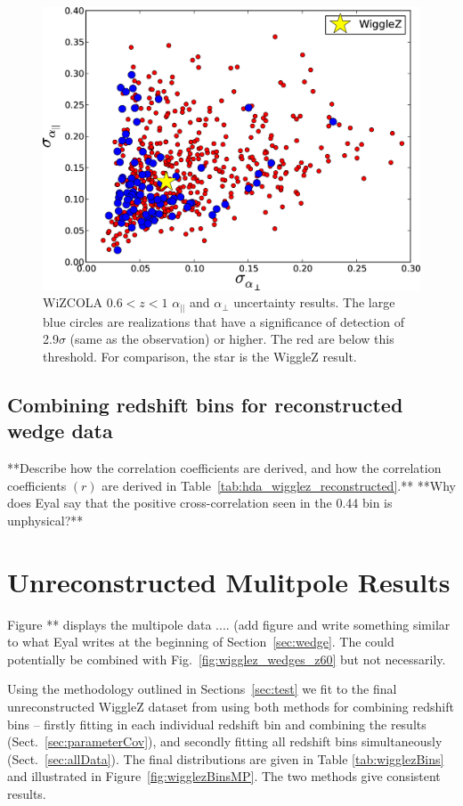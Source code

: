 \documentclass[iop,twocolappendix]{emulateapj}
\newcommand{\blue}{\color{blue}}
\begin{document}
{\begin{figure}
\begin{center}
\includegraphics[width=0.7\columnwidth]{figures/WiZCOLA_unc_z0pt6_1pt0/WiZCOLA_unc_z0pt6_1pt0}
\caption{\label{fig:wizcola_hdaUnc_z60_epsilonT15} WiZCOLA $0.6<z<1$ $\alpha_{||}$ and $\alpha_\perp$ uncertainty results. The large blue circles are realizations that have a significance of detection of 2.9$\sigma$ (same as the observation) or higher. The red are below this threshold. For comparison, the star is the WiggleZ result.%
}
\end{center}
\end{figure}

\subsection{Combining redshift bins for reconstructed wedge data}
**Describe how the correlation coefficients are derived, and how the correlation coefficients $(r)$ are derived in Table~\ref{tab:hda_wigglez_reconstructed}.**  **Why does Eyal say that the positive cross-correlation seen in the 0.44 bin is unphysical?**

} %








\section{Unreconstructed Mulitpole Results}
\label{sec:multi}
{\blue Figure ** displays the multipole data .... (add figure and write something similar to what Eyal writes at the beginning of Section~\ref{sec:wedge}.  The could potentially be combined with Fig.~\ref{fig:wigglez_wedges_z60} but not necessarily. }

Using the methodology outlined in Sections~\ref{sec:test} we fit to the final unreconstructed WiggleZ dataset from \citet{KazinKoda2014} using both methods for combining redshift bins -- firstly fitting in each individual redshift bin and combining the results (Sect.~\ref{sec:parameterCov}), and secondly fitting all redshift bins simultaneously (Sect.~\ref{sec:allData}). The final distributions are given in Table \ref{tab:wigglezBins} and illustrated in Figure~\ref{fig:wigglezBinsMP}.  The two methods give consistent results. 
\end{document}
